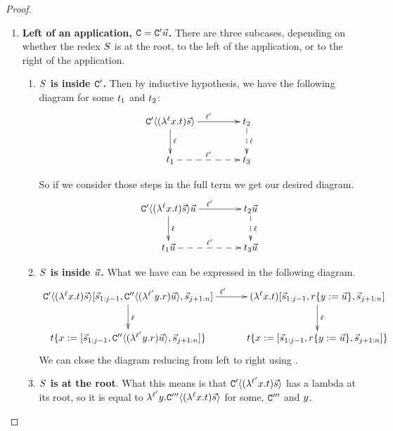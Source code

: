 \begin{proof}
\begin{enumerate}
\item {\bf Left of an application, $\mathtt{C} = \mathtt{C}'\vec{u}$.}
    There are three subcases, depending on whether the redex $S$ is
    at the root, to the left of the application, or to the right of the application.
    \begin{enumerate}
    \item {\bf $S$ is inside $\mathtt{C}'$.} Then by inductive hypothesis,
        we have the following diagram for some $t_1$ and $t_2$:
        \[
        \xymatrix@C=1.5cm{
            \contwoof{(\lamp{\lab}{\var}{\tm}) \ls{\tmtwo}}
                            \ar[d]^{\lab}
                            \ar[r]^{\lab'} &
            {\tm_2} \ar@{-->}[d]^{\lab} \\ 
            {\tm_1} \ar@{-->}[r]^{\lab'} &
            {\tm_3} \\
        }
        \]
        
        So if we consider those steps in the full term we get our desired diagram.
        \[
        \xymatrix@C=1.5cm{
            {\contwoof{(\lamp{\lab}{\var}{\tm}) \ls{\tmtwo}}} \ls{\tmthree}
                            \ar[d]^{\lab}
                            \ar[r]^{\lab'} &
            \tm_2 \ls{\tmthree} \ar@{-->}[d]^{\lab} \\ 
            \tm_1 \ls{\tmthree} \ar@{-->}[r]^{\lab'} &
            \tm_3 \ls{\tmthree} \\
        }
        \]
    \item {\bf $S$ is inside $\vec{u}$.}
      What we have can be expressed in the following diagram.
        \[
        \xymatrix@C=1cm{
         \contwoof{(\lamp{\lab}{\var}{\tm}) \ls{\tmtwo}} [\ls{\tmtwo}_{1:j-1},
                                   \con''\of{(\lamp{\lab'}{\vartwo}{\tmfour}) \ls{\tmthree}},
                                   \ls{\tmtwo}_{j+1:n}]
                            \ar[d]^{\lab}
                            \ar[r]^{\lab'} &
         (\lamp{\lab}{\var}{\tm}) [\ls{\tmtwo}_{1:j-1},
                                   \subs{\tmfour}{\vartwo}{\ls{\tmthree}},
                                   \ls{\tmtwo}_{j+1:n}]
                           \ar[d]^{\lab} \\
         \subs{\tm}{\var}{[\ls{\tmtwo}_{1:j-1},
                           \con''\of{(\lamp{\lab'}{\vartwo}{\tmfour}) \ls{\tmthree}},
                           \ls{\tmtwo}_{j+1:n}]}
                           &
         \subs{\tm}{\var}{[\ls{\tmtwo}_{1:j-1},
                           \subs{\tmfour}{\vartwo}{\ls{\tmthree}},
                           \ls{\tmtwo}_{j+1:n}]} \\
        }
        \]
    We can close the diagram reducing from left to right using .
    \item {\bf $S$ is at the root}.
    What this means is that $\mathtt{C}'\langle(\lambda^{\ell'} x. t)\vec{s}\rangle$ has a lambda at its root,
    so it is equal to $\lambda^{\ell'} y. \mathtt{C}'''\langle(\lambda^{\ell} x. t) \vec{s}\rangle$
    for some, $\mathtt{C}'''$ and $y$.


\end{enumerate}
\end{enumerate}
\end{proof}

